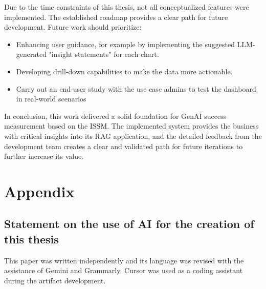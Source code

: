 \documentclass[
	english,
	ruledheaders=section,%
	class=report,%
	thesis={type=bachelor},%
	accentcolor=1b,%
	custommargins=true,%
	marginpar=false,%
	parskip=half-,%
	fontsize=11pt,%
	DIV=14,
]{tudapub}
\begin{document}
Due to the time constraints of this thesis, not all conceptualized features were implemented. The established roadmap provides a clear path for future development. Future work should prioritize:
\begin{itemize}
    \item Enhancing user guidance, for example by implementing the suggested LLM-generated "insight statements" for each chart.
    \item Developing drill-down capabilities to make the data more actionable.
    \item Carry out an end-user study with the use case admins to test the dashboard in real-world scenarios
\end{itemize}

In conclusion, this work delivered a solid foundation for GenAI success measurement based on the ISSM. The implemented system provides the business with critical insights into its RAG application, and the detailed feedback from the development team creates a clear and validated path for future iterations to further increase its value.
\chapter*{Appendix}
\setcounter{page}{\value{seitenzahlroemisch}}
\section{Statement on the use of AI for the creation of this thesis}
This paper was written independently and its language was revised with the assistance of Gemini and Grammarly. Cursor was used as a coding assistant during the artifact development.

\printbibliography


\end{document}
